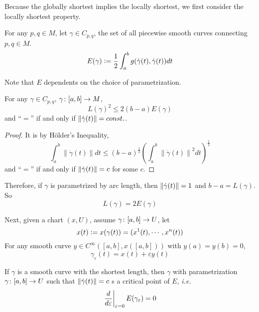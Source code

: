 Because the globally shortest implies the locally shortest, we first consider the locally shortest property.
\begin{defn}
	For any $p,q \in M$, let $\gamma \in C_{p,q}$, the set of all piecewise smooth curves connecting $p,q \in M$.
	\begin{equation*}
		E(\gamma) \vcentcolon= \frac{1}{2}\int_a^bg(\dot{\gamma}(t),\dot{\gamma}(t))dt
	\end{equation*}
\end{defn}
Note that $E$ dependents on the choice of parametrization.
\begin{lem}
	For any $\gamma \in C_{p,q}$, $\gamma \colon [a,b] \rightarrow M$,
	\begin{equation*}
		L(\gamma)^2 \leq 2(b-a)E(\gamma)
	\end{equation*}
	and ``$=$'' if and only if $\left\lVert\dot{\gamma}(t)\right\lVert = const.$.
\end{lem}
\begin{proof}
	It is by H\"older's Inequality,
	\begin{equation*}
		\int_a^b\left\|\dot{\gamma}(t)\right\| d t \leq(b-a)^{\frac{1}{2}}\left(\int_a^b\left\|\dot{\gamma}(t)\right\|^2 d t\right)^{\frac{1}{2}}
	\end{equation*}
	and ``$=$'' if and only if $\left\lVert\dot{\gamma}(t)\right\lVert = c$ for some $c$.
\end{proof}
\begin{rmk}
	Therefore, if $\gamma$ is parametrized by arc length, then $\left\lVert\dot{\gamma}(t)\right\lVert = 1$ and $b-a = L(\gamma)$. So
	\begin{equation*}
		L(\gamma) = 2E(\gamma)
	\end{equation*}
\end{rmk}
Next, given a chart $(x,U)$, assume $\gamma \colon [a,b] \rightarrow U$, let
\begin{equation*}
	x(t) \vcentcolon= x(\gamma(t)) = (x^1(t),\cdots,x^n(t))
\end{equation*}
For any smooth curve $y \in C^\infty([a,b],x([a,b]))$ with $y(a)=y(b) = 0$, 
\begin{equation*}
	\gamma_\varepsilon(t) = x(t)+\varepsilon y(t)
\end{equation*}
\begin{lem}
	If $\gamma$ is a smooth curve with the shortest length, then $\gamma$ with parametrization $\gamma \colon [a,b] \rightarrow U$ such that $\left\lVert\dot{\gamma}(t)\right\lVert = c$ s a critical point of $E$, \emph{i.e.}
	\begin{equation*}
		\left.\frac{d}{d\varepsilon}\right\lvert_{\varepsilon = 0} E(\gamma_\varepsilon) = 0
	\end{equation*}
\end{lem}

